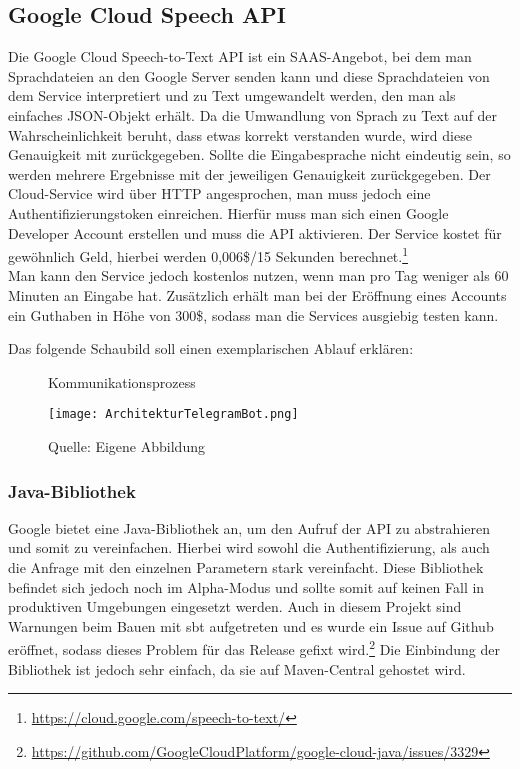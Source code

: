 \subsection{Google Cloud Speech API}
Die Google Cloud Speech-to-Text API ist ein SAAS-Angebot, bei dem man Sprachdateien an den Google Server senden kann und diese Sprachdateien von dem Service interpretiert und zu Text umgewandelt werden, den man als einfaches JSON-Objekt erhält. Da die Umwandlung von Sprach zu Text auf der Wahrscheinlichkeit beruht, dass etwas korrekt verstanden wurde, wird diese Genauigkeit mit zurückgegeben. Sollte die Eingabesprache nicht eindeutig sein, so werden mehrere Ergebnisse mit der jeweiligen Genauigkeit zurückgegeben.
Der Cloud-Service wird über HTTP angesprochen, man muss jedoch eine Authentifizierungstoken einreichen. Hierfür muss man sich einen Google Developer Account erstellen und muss die API aktivieren. Der Service kostet für gewöhnlich Geld, hierbei werden 0,006\$/15 Sekunden berechnet.\footnote{\url{https://cloud.google.com/speech-to-text/}} \\
Man kann den Service jedoch kostenlos nutzen, wenn man pro Tag weniger als 60 Minuten an Eingabe hat. Zusätzlich erhält man bei der Eröffnung eines Accounts ein Guthaben in Höhe von 300\$, sodass man die Services ausgiebig testen kann.

Das folgende Schaubild soll einen exemplarischen Ablauf erklären:
\begin{figure}[!htb]
    \centering
    \caption{Kommunikationsprozess}
      \texttt{[image: ArchitekturTelegramBot.png]}
      \label{img:architektur}
    \caption*{Quelle: Eigene Abbildung}
\end{figure}

\subsubsection{Java-Bibliothek}
Google bietet eine Java-Bibliothek an, um den Aufruf der API zu abstrahieren und somit zu vereinfachen. Hierbei wird sowohl die Authentifizierung, als auch die Anfrage mit den einzelnen Parametern stark vereinfacht. Diese Bibliothek befindet sich jedoch noch im Alpha-Modus und sollte somit auf keinen Fall in produktiven Umgebungen eingesetzt werden. Auch in diesem Projekt sind Warnungen beim Bauen mit sbt aufgetreten und es wurde ein Issue auf Github eröffnet, sodass dieses Problem für das Release gefixt wird.\footnote{\url{https://github.com/GoogleCloudPlatform/google-cloud-java/issues/3329}} 
Die Einbindung der Bibliothek ist jedoch sehr einfach, da sie auf Maven-Central gehostet wird.

